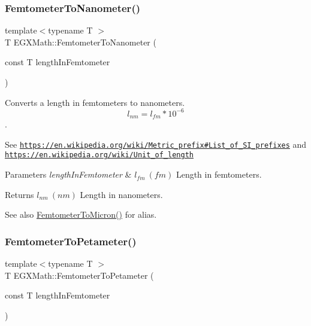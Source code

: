 \subsubsection{\texorpdfstring{Femtometer\+To\+Nanometer()}{FemtometerToNanometer()}}
{\footnotesize\ttfamily template$<$typename T $>$ \\
T E\+G\+X\+Math\+::\+Femtometer\+To\+Nanometer (\begin{DoxyParamCaption}\item[{const T}]{length\+In\+Femtometer }\end{DoxyParamCaption})}



Converts a length in femtometers to nanometers. \[ l_{nm}=l_{fm} * 10^{-6} \]. 

See \href{https://en.wikipedia.org/wiki/Metric_prefix#List_of_SI_prefixes}{\tt https\+://en.\+wikipedia.\+org/wiki/\+Metric\+\_\+prefix\#\+List\+\_\+of\+\_\+\+S\+I\+\_\+prefixes} and \href{https://en.wikipedia.org/wiki/Unit_of_length}{\tt https\+://en.\+wikipedia.\+org/wiki/\+Unit\+\_\+of\+\_\+length} 
\begin{DoxyParams}{Parameters}
{\em length\+In\+Femtometer} & $ l_{fm}\ (fm)$ Length in femtometers. \\
\hline
\end{DoxyParams}
\begin{DoxyReturn}{Returns}
$ l_{nm}\ (nm)$ Length in nanometers. 
\end{DoxyReturn}
\begin{DoxySeeAlso}{See also}
\mbox{\hyperlink{group___e_g_x_math-_conversions-_length_conversions-_femtometer-_non-_s_i_gac1a358bdb9bf33dec3cb847cafe1bc71}{Femtometer\+To\+Micron()}} for alias. 
\end{DoxySeeAlso}
\mbox{\label{group___e_g_x_math-_conversions-_length_conversions-_femtometer-_s_i_ga2145008022cfedfb81e40ceea426cda5}} 
\subsubsection{\texorpdfstring{Femtometer\+To\+Petameter()}{FemtometerToPetameter()}}
{\footnotesize\ttfamily template$<$typename T $>$ \\
T E\+G\+X\+Math\+::\+Femtometer\+To\+Petameter (\begin{DoxyParamCaption}\item[{const T}]{length\+In\+Femtometer }\end{DoxyParamCaption})}



